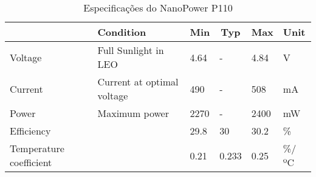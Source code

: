 \begin{table}
\centering
\caption{Especificações do NanoPower P110}
\label{pv_specs_table}
\begin{tabular}{|l|l|l|l|l|l|} 
\cline{2-6}
\multicolumn{1}{c|}{} & Condition                  & \multicolumn{1}{c|}{Min} & \multicolumn{1}{c|}{Typ} & \multicolumn{1}{c|}{Max} & Unit  \\ 
\hline
Voltage               & Full Sunlight in LEO       & 4.64                     & -                        & 4.84                     & V     \\ 
\hline
Current               & Current at optimal voltage & 490                      & -                        & 508                      & mA    \\ 
\hline
Power                 & Maximum power              & 2270                     & -                        & 2400                     & mW    \\ 
\hline
Efficiency            &                            & 29.8                     & 30                       & 30.2                     & \%    \\
\hline
Temperature coefficient &                            & 0.21                     & 0.233                       & 0.25                     & \%/ºC    \\
\hline
\end{tabular}
\end{table}